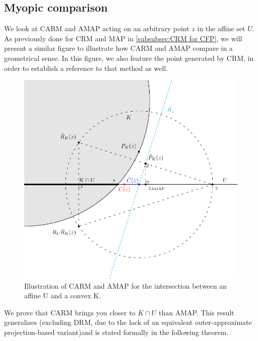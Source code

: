 \documentclass[smallextended,numbook,nospthms]{svjour3}
\theoremstyle{plain}
\theoremstyle{definition}
\begin{document}
\subsection{Myopic comparison}\label{subsec:myopic comp}

We look at CARM and AMAP acting on an arbitrary point $z$ in the affine set $U$. As previously done for CRM and MAP in \cref{subsubsec:CRM for CFP}, we will present a similar figure to illustrate how CARM and AMAP compare in a geometrical sense. In this figure, we also feature the point generated by CRM, in order to establish a reference to that method as well.

\begin{figure}[h!]
	\centering
	\includegraphics[scale=0.8]{ConvexAffine-CARM}
	\caption{Illustration of CARM and AMAP for the intersection between an affine U and a convex K.}
	\label{fig:CARM AMAP comp}
\end{figure}

We prove that CARM brings you closer to $K \cap U$ than AMAP. This result generalizes \cite[Theorem 2]{Behling:2020} (excluding DRM, due to the lack of an equivalent outer-approximate projection-based variant)and is stated formally in the following theorem.
\end{document}
